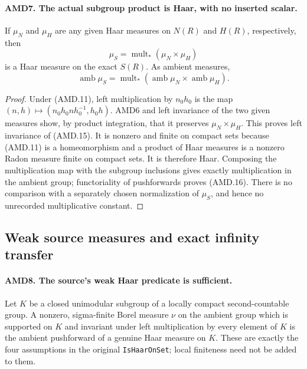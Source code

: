 \paragraph{AMD7. The actual subgroup product is Haar, with no inserted scalar.}
\label{claim:AMD7}
If \(\mu_N\) and \(\mu_H\) are any given Haar measures on
\(N(R)\) and \(H(R)\), respectively, then
\[
       \mu_S=\operatorname{mult}_*(\mu_N\times\mu_H)
 \tag{AMD.15}
\]
is a Haar measure on the exact \(S(R)\).  As ambient measures,
\[
 \operatorname{amb}\mu_S
   =\operatorname{mult}_*
       (\operatorname{amb}\mu_N\times\operatorname{amb}\mu_H).
 \tag{AMD.16}
\]

\begin{proof}
Under (AMD.11), left multiplication by \(n_0h_0\) is the map
\((n,h)\mapsto(n_0h_0nh_0^{-1},h_0h)\).  AMD6 and left
invariance of the two given measures show, by product integration,
that it preserves \(\mu_N\times\mu_H\).  This proves left
invariance of (AMD.15).  It is nonzero and finite on compact
sets because (AMD.11) is a homeomorphism and a product of Haar
measures is a nonzero Radon measure finite on compact sets.
It is therefore Haar.  Composing the multiplication map with
the subgroup inclusions gives exactly multiplication in the
ambient group; functoriality of pushforwards proves (AMD.16).
There is no comparison with a separately chosen normalization
of \(\mu_S\), and hence no unrecorded multiplicative constant.
\end{proof}

\subsection{Weak source measures and exact infinity transfer}

\paragraph{AMD8. The source's weak Haar predicate is sufficient.}
\label{claim:AMD8}
Let \(K\) be a closed unimodular subgroup of a locally compact
second-countable group.  A nonzero, sigma-finite Borel measure
\(\nu\) on the ambient group which is supported on \(K\)
and invariant under left multiplication by every element of
\(K\) is the ambient pushforward of a genuine Haar measure
on \(K\).  These are exactly the four assumptions in the
original \texttt{IsHaarOnSet}; local finiteness need not be
added to them.


